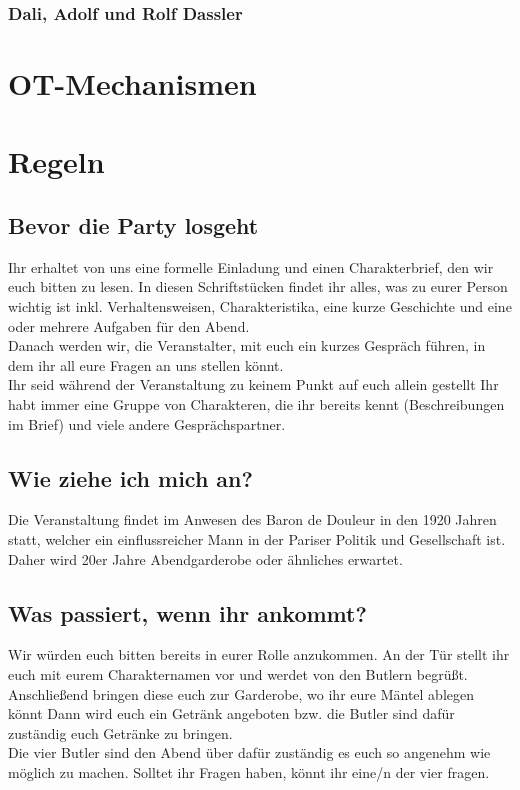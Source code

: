 \documentclass[12pt, a4paper, openany]{report}
\begin{document}
\subsection{Dali, Adolf und Rolf Dassler}

\chapter{OT-Mechanismen}

\chapter{Regeln}
\section{Bevor die Party losgeht}
Ihr erhaltet von uns eine formelle Einladung und einen Charakterbrief, den wir euch bitten zu lesen. In diesen Schriftstücken findet ihr alles, was zu eurer Person wichtig ist inkl. Verhaltensweisen, Charakteristika, eine kurze Geschichte und eine oder mehrere Aufgaben für den Abend. \\
Danach werden wir, die Veranstalter, mit euch ein kurzes Gespräch führen, in dem ihr all eure Fragen an uns stellen könnt.\\
Ihr seid während der Veranstaltung zu keinem Punkt auf euch allein gestellt Ihr habt immer eine Gruppe von Charakteren, die ihr bereits kennt (Beschreibungen im Brief) und viele andere Gesprächspartner. 
\section{Wie ziehe ich mich an?}
Die Veranstaltung findet im Anwesen des Baron de Douleur in den 1920 Jahren statt, welcher ein einflussreicher Mann in der Pariser Politik und Gesellschaft ist. Daher wird 20er Jahre Abendgarderobe oder ähnliches erwartet. 
\section{Was passiert, wenn ihr ankommt?}
Wir würden euch bitten bereits in eurer Rolle anzukommen. An der Tür stellt ihr euch mit eurem Charakternamen vor und werdet von den Butlern begrüßt. Anschließend bringen diese euch zur Garderobe, wo ihr eure Mäntel ablegen könnt Dann wird euch ein Getränk angeboten bzw. die Butler sind dafür zuständig euch Getränke zu bringen.\\
Die vier Butler sind den Abend über dafür zuständig es euch so angenehm wie möglich zu machen. Solltet ihr Fragen haben, könnt ihr eine/n der vier fragen.
\end{document}
